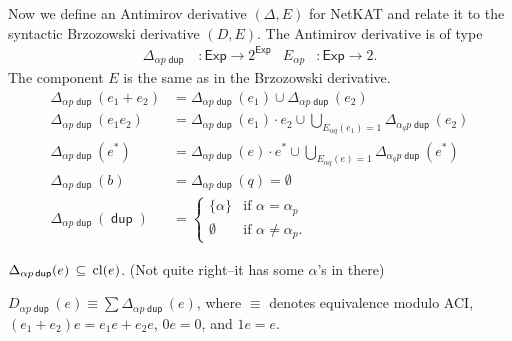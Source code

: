 \documentclass{article}
\newcommand\ssum{\mathop{\textstyle\sum}}
\newcommand\pdup{\mathop{\mathsf{dup}}}
\newcommand\Exp{\mathsf{Exp}}
\renewcommand\star{^{\textstyle *}}
\renewcommand\powerset[1]{2^{#1}}
\newcommand\clname{\mathrm{cl}}
\newcommand\cl[1]{\clname(#1)}
\begin{document}
Now we define an Antimirov derivative $(\Delta,E)$ for NetKAT and relate it to the syntactic Brzozowski derivative $(D,E)$. The Antimirov derivative is of type
\begin{align*}
\Delta_{\alpha p\pdup} &: \Exp\to\powerset\Exp & E_{\alpha p} &: \Exp\to 2.
\end{align*}
The component $E$ is the same as in the Brzozowski derivative.
\begin{align*}
\Delta_{\alpha p\pdup}(e_1+e_2) &= \Delta_{\alpha p\pdup}(e_1) \cup \Delta_{\alpha p\pdup}(e_2)\\
\Delta_{\alpha p\pdup}(e_1e_2) &= \Delta_{\alpha p\pdup}(e_1)\cdot e_2 \cup \bigcup_{E_{\alpha q}(e_1)=1}\Delta_{\alpha_q p\pdup}(e_2)\\
\Delta_{\alpha p\pdup}(e\star) &= \Delta_{\alpha p\pdup}(e)\cdot e\star \cup \bigcup_{E_{\alpha q}(e)=1}\Delta_{\alpha_q p\pdup}(e\star)\\
\Delta_{\alpha p\pdup}(b) &= \Delta_{\alpha p\pdup}(q) = \emptyset\\
\Delta_{\alpha p\pdup}(\pdup) &= \begin{cases}
\{\alpha\} & \text{if $\alpha=\alpha_p$}\\
\emptyset & \text{if $\alpha\neq\alpha_p$.}
\end{cases}
\end{align*}

\begin{lemma}
\label{eq:Deltacl}
$\Delta_{\alpha p\pdup}(e) \subs \cl e$. (Not quite right--it has some $\alpha$'s in there)
\end{lemma}

\begin{lemma}
\label{eq:DDelta}
$D_{\alpha p\pdup}(e) \equiv \ssum\Delta_{\alpha p\pdup}(e)$,
where $\equiv$ denotes equivalence modulo ACI, $(e_1+e_2)e = e_1e + e_2e$, $0e = 0$, and $1e = e$.
\end{lemma}
\end{document}
